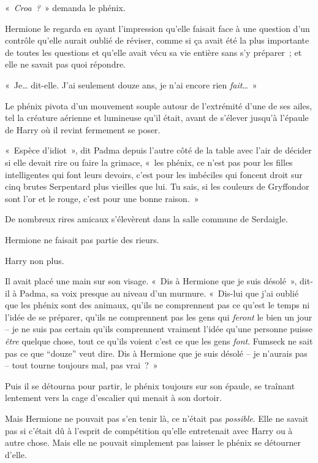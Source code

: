 «~\emph{Croa~?}~» demanda le phénix.

Hermione le regarda en ayant l'impression qu'elle faisait face à une question d'un contrôle qu'elle aurait oublié de réviser, comme si ça avait été la plus importante de toutes les questions et qu'elle avait vécu sa vie entière sans s'y préparer~; et elle ne savait pas quoi répondre.

«~Je… dit-elle.
J'ai seulement douze ans, je n'ai encore rien \emph{fait}…~»

Le phénix pivota d'un mouvement souple autour de l'extrémité d'une de ses ailes, tel la créature aérienne et lumineuse qu'il était, avant de s'élever jusqu'à l'épaule de Harry où il revint fermement se poser.

«~Espèce d'idiot~», dit Padma depuis l'autre côté de la table avec l'air de décider si elle devait rire ou faire la grimace, «~les phénix, ce n'est pas pour les filles intelligentes qui font leurs devoirs, c'est pour les imbéciles qui foncent droit sur cinq brutes Serpentard plus vieilles que lui.
Tu sais, si les couleurs de Gryffondor sont l'or et le rouge, c'est pour une bonne raison.~»

De nombreux rires amicaux s'élevèrent dans la salle commune de Serdaigle.

Hermione ne faisait pas partie des rieurs.

Harry non plus.

Il avait placé une main sur son visage.
«~Dis à Hermione que je suis désolé~», dit-il à Padma, sa voix presque au niveau d'un murmure.
«~Dis-lui que j'ai oublié que les phénix sont des animaux, qu'ils ne comprennent pas ce qu'est le temps ni l'idée de se préparer, qu'ils ne comprennent pas les gens qui \emph{feront} le bien un jour -- je ne suis pas certain qu'ils comprennent vraiment l'idée qu'une personne puisse \emph{être} quelque chose, tout ce qu'ils voient c'est ce que les gens \emph{font}.
Fumseck ne sait pas ce que “douze” veut dire.
Dis à Hermione que je suis désolé -- je n'aurais pas -- tout tourne toujours mal, pas vrai~?~»

Puis il se détourna pour partir, le phénix toujours sur son épaule, se traînant lentement vers la cage d'escalier qui menait à son dortoir.

Mais Hermione ne pouvait pas s'en tenir là, ce n'était pas \emph{possible}.
Elle ne savait pas si c'était dû à l'esprit de compétition qu'elle entretenait avec Harry ou à autre chose.
Mais elle ne pouvait simplement pas laisser le phénix se détourner d'elle.

